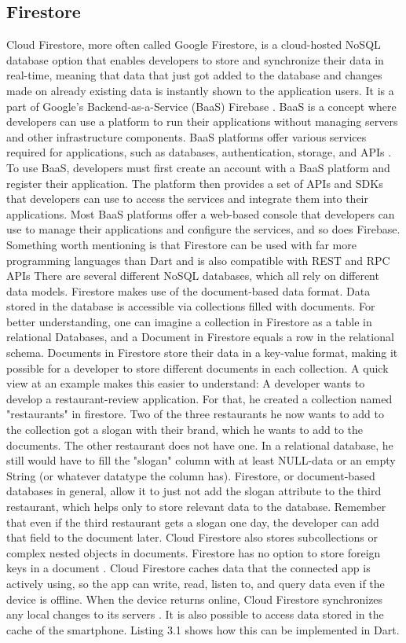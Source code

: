 \subsection{Firestore}
Cloud Firestore, more often called Google Firestore, is a cloud-hosted NoSQL database option that enables developers to store and synchronize their data in real-time, meaning that data that just got added to the database and changes made on already existing data is instantly shown to the application users. It is a part of Google's Backend-as-a-Service (BaaS) Firebase \cite[p. 458 ]{.baasfirebase}. BaaS is a concept where developers can use a platform to run their applications without managing servers and other infrastructure components. BaaS platforms offer various services required for applications, such as databases, authentication, storage, and APIs \cite{.baasokta}. To use BaaS, developers must first create an account with a BaaS platform and register their application. The platform then provides a set of APIs and SDKs that developers can use to access the services and integrate them into their applications. Most BaaS platforms offer a web-based console that developers can use to manage their applications and configure the services, and so does Firebase. Something worth mentioning is that Firestore can be used with far more programming languages than Dart and is also compatible with REST and RPC APIs There are several different NoSQL databases, which all rely on different data models. Firestore makes use of the document-based data format. Data stored in the database is accessible via collections filled with documents. For better understanding, one can imagine a collection in Firestore as a table in relational Databases, and a Document in Firestore equals a row in the relational schema. Documents in Firestore store their data in a key-value format, making it possible for a developer to store different documents in each collection. A quick view at an example makes this easier to understand: A developer wants to develop a restaurant-review application. For that, he created a collection named "restaurants" in firestore. Two of the three restaurants he now wants to add to the collection got a slogan with their brand, which he wants to add to the documents. The other restaurant does not have one. In a relational database, he still would have to fill the "slogan" column with at least NULL-data or an empty String (or whatever datatype the column has). Firestore, or document-based databases in general, allow it to just not add the slogan attribute to the third restaurant, which helps only to store relevant data to the database. Remember that even if the third restaurant gets a slogan one day, the developer can add that field to the document later. Cloud Firestore also stores subcollections or complex nested objects in documents. Firestore has no option to store foreign keys in a document \cite{.firestore}. Cloud Firestore caches data that the connected app is actively using, so the app can write, read, listen to, and query data even if the device is offline. When the device returns online, Cloud Firestore synchronizes any local changes to its servers \cite{.firestore}. It is also possible to access data stored in the cache of the smartphone. Listing 3.1 shows how this can be implemented in Dart.
